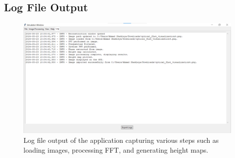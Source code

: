 \documentclass[../main.tex]{subfiles}
\begin{document}
\subsection{Log File Output}
\begin{figure}[H]
\centering
\includegraphics[width=\textwidth]{Images/Appendix/reconstruction/log}
\caption{Log file output of the application capturing various steps such as loading images, processing FFT, and generating height maps.}
\end{figure}
\end{document}
